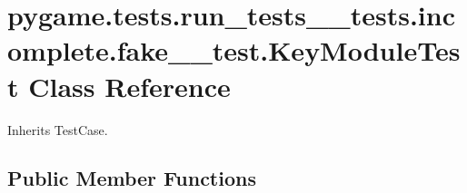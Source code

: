 \hypertarget{classpygame_1_1tests_1_1run__tests____tests_1_1incomplete_1_1fake__3__test_1_1_key_module_test}{}\section{pygame.\+tests.\+run\+\_\+tests\+\_\+\+\_\+tests.\+incomplete.\+fake\+\_\+\_\+test.\+Key\+Module\+Test Class Reference}
\label{classpygame_1_1tests_1_1run__tests____tests_1_1incomplete_1_1fake__3__test_1_1_key_module_test}


Inherits Test\+Case.

\subsection*{Public Member Functions}
